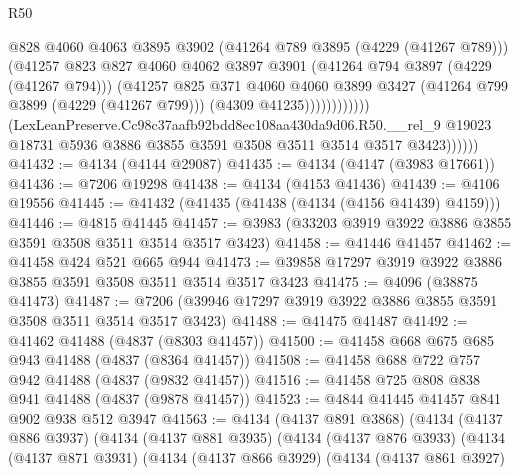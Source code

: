 \begin{lexlean}{R50}
\begin{coremodule}
                                @828
                                @4060
                                @4063
                                @3895
                                @3902
                                (@41264 @789 @3895 (@4229 (@41267 @789)))
                                (@41257
                                  @823
                                  @827
                                  @4060
                                  @4062
                                  @3897
                                  @3901
                                  (@41264 @794 @3897 (@4229 (@41267 @794)))
                                  (@41257
                                    @825
                                    @371
                                    @4060
                                    @4060
                                    @3899
                                    @3427
                                    (@41264 @799 @3899 (@4229 (@41267 @799)))
                                    (@4309 @41235))))))))))))
              (LexLeanPreserve.Cc98c37aafb92bdd8ec108aa430da9d06.R50.__rel_9
                @19023
                @18731
                @5936
                @3886
                @3855
                @3591
                @3508
                @3511
                @3514
                @3517
                @3423))))))
@41432 := @4134 (@4144 @29087)
@41435 := @4134 (@4147 (@3983 @17661))
@41436 := @7206 @19298
@41438 := @4134 (@4153 @41436)
@41439 := @4106 @19556
@41445 := @41432 (@41435 (@41438 (@4134 (@4156 @41439) @4159)))
@41446 := @4815 @41445
@41457 := @3983 (@33203 @3919 @3922 @3886 @3855 @3591 @3508 @3511 @3514 @3517 @3423)
@41458 := @41446 @41457
@41462 := @41458 @424 @521 @665 @944
@41473 := @39858 @17297 @3919 @3922 @3886 @3855 @3591 @3508 @3511 @3514 @3517 @3423
@41475 := @4096 (@38875 @41473)
@41487 := @7206 (@39946 @17297 @3919 @3922 @3886 @3855 @3591 @3508 @3511 @3514 @3517 @3423)
@41488 := @41475 @41487
@41492 := @41462 @41488 (@4837 (@8303 @41457))
@41500 := @41458 @668 @675 @685 @943 @41488 (@4837 (@8364 @41457))
@41508 := @41458 @688 @722 @757 @942 @41488 (@4837 (@9832 @41457))
@41516 := @41458 @725 @808 @838 @941 @41488 (@4837 (@9878 @41457))
@41523 := @4844 @41445 @41457 @841 @902 @938 @512 @3947
@41563 := @4134
    (@4137 @891 @3868)
    (@4134
      (@4137 @886 @3937)
      (@4134
        (@4137 @881 @3935)
        (@4134
          (@4137 @876 @3933)
          (@4134
            (@4137 @871 @3931)
            (@4134
              (@4137 @866 @3929)
              (@4134
                (@4137 @861 @3927)

\end{coremodule}
\end{lexlean}
